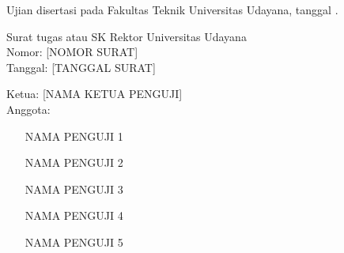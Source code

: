 \newpage
{}
\begin{center}
\begin{onehalfspace}
Ujian disertasi pada Fakultas Teknik Universitas Udayana, tanggal \tglujiandanpenilaian.
\end{onehalfspace}
\end{center}
\begin{center}
Surat tugas atau SK Rektor Universitas Udayana\\
Nomor: [NOMOR SURAT]\\
Tanggal: [TANGGAL SURAT]
\end{center}
\begin{onehalfspace}
\raggedright
Ketua: [NAMA KETUA PENGUJI]\\
Anggota:
\begin{enumerate}
\item [NAMA PENGUJI 1]
\item [NAMA PENGUJI 2]
\item [NAMA PENGUJI 3]
\item [NAMA PENGUJI 4]
\item [NAMA PENGUJI 5]
\end{enumerate}
\end{onehalfspace}
